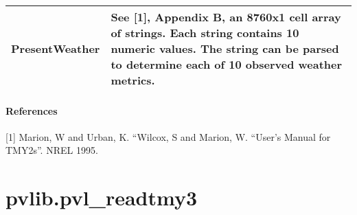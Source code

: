 \documentclass[letterpaper,10pt,english]{sphinxmanual}
\begin{document}
\begin{fulllineitems}
\begin{longtable}{|l|p{11cm}|}
PresentWeather
 & 
See {[}1{]}, Appendix B, an 8760x1 cell array of strings. Each string contains 10 numeric values. The string can be parsed to determine each of 10 observed weather metrics.
\\
\hline\end{longtable}

\paragraph{References}

{[}1{]} Marion, W and Urban, K. ``Wilcox, S and Marion, W. ``User's Manual
for TMY2s''. NREL 1995.

\end{fulllineitems}



\section{pvlib.pvl\_readtmy3}
\label{stubs/pvlib.pvl_readtmy3:pvlib-pvl-readtmy3}\label{stubs/pvlib.pvl_readtmy3::doc}
\end{document}
